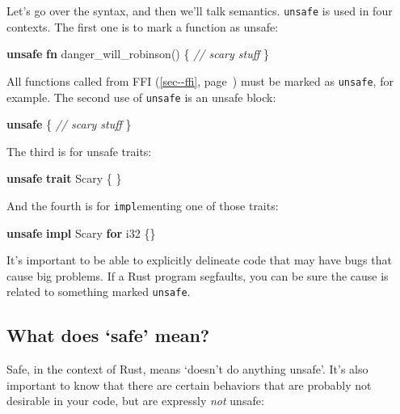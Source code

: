 \documentclass[a4paper,]{book}
\renewcommand*{\hyperlink}[2]{%
 #2 (\autoref{#1}, page~\pageref{#1})}
\newenvironment{Shaded}{\begin{snugshade}}{\end{snugshade}}
\newcommand{\KeywordTok}[1]{\textcolor[rgb]{0.13,0.29,0.53}{\textbf{{#1}}}}
\newcommand{\DataTypeTok}[1]{\textcolor[rgb]{0.13,0.29,0.53}{{#1}}}
\newcommand{\CommentTok}[1]{\textcolor[rgb]{0.56,0.35,0.01}{\textit{{#1}}}}
\newcommand{\NormalTok}[1]{{#1}}
\begin{document}
Let's go over the syntax, and then we'll talk semantics. \texttt{unsafe}
is used in four contexts. The first one is to mark a function as unsafe:

\begin{Shaded}
\begin{Highlighting}[]
\KeywordTok{unsafe} \KeywordTok{fn} \NormalTok{danger_will_robinson() \{}
    \CommentTok{// scary stuff}
\NormalTok{\}}
\end{Highlighting}
\end{Shaded}

All functions called from \protect\hyperlink{sec--ffi}{FFI} must be
marked as \texttt{unsafe}, for example. The second use of
\texttt{unsafe} is an unsafe block:

\begin{Shaded}
\begin{Highlighting}[]
\KeywordTok{unsafe} \NormalTok{\{}
    \CommentTok{// scary stuff}
\NormalTok{\}}
\end{Highlighting}
\end{Shaded}

The third is for unsafe traits:

\begin{Shaded}
\begin{Highlighting}[]
\KeywordTok{unsafe} \KeywordTok{trait} \NormalTok{Scary \{ \}}
\end{Highlighting}
\end{Shaded}

And the fourth is for \texttt{impl}ementing one of those traits:

\begin{Shaded}
\begin{Highlighting}[]
\KeywordTok{unsafe} \KeywordTok{impl} \NormalTok{Scary }\KeywordTok{for} \DataTypeTok{i32} \NormalTok{\{\}}
\end{Highlighting}
\end{Shaded}

It's important to be able to explicitly delineate code that may have
bugs that cause big problems. If a Rust program segfaults, you can be
sure the cause is related to something marked \texttt{unsafe}.

\subsection{\texorpdfstring{What does `safe'
mean?}{What does safe mean?}}\label{what-does-safe-mean}

Safe, in the context of Rust, means `doesn't do anything unsafe'. It's
also important to know that there are certain behaviors that are
probably not desirable in your code, but are expressly \emph{not}
unsafe:
\end{document}
